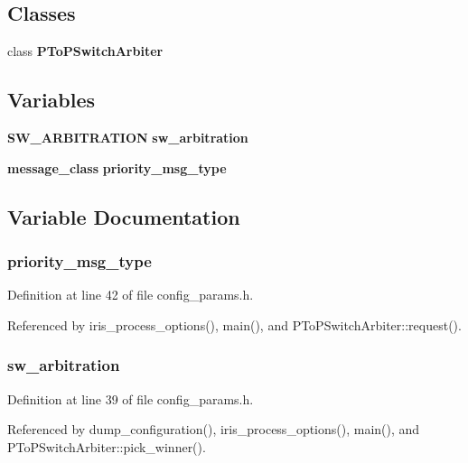 \subsection*{Classes}
\begin{CompactItemize}
\item 
class {\bf PToPSwitchArbiter}
\end{CompactItemize}
\subsection*{Variables}
\begin{CompactItemize}
\item 
{\bf SW\_\-ARBITRATION} {\bf sw\_\-arbitration}
\item 
{\bf message\_\-class} {\bf priority\_\-msg\_\-type}
\end{CompactItemize}


\subsection{Variable Documentation}
\subsubsection[{priority\_\-msg\_\-type}]{ {\bf priority\_\-msg\_\-type}}\label{ptop__swa_8h_d5a703dac7fa374903a9f220ede1b2d6}




Definition at line 42 of file config\_\-params.h.

Referenced by iris\_\-process\_\-options(), main(), and PToPSwitchArbiter::request().
\subsubsection[{sw\_\-arbitration}]{ {\bf sw\_\-arbitration}}\label{ptop__swa_8h_045249e2273cf27331b1300b811640ba}




Definition at line 39 of file config\_\-params.h.

Referenced by dump\_\-configuration(), iris\_\-process\_\-options(), main(), and PToPSwitchArbiter::pick\_\-winner().